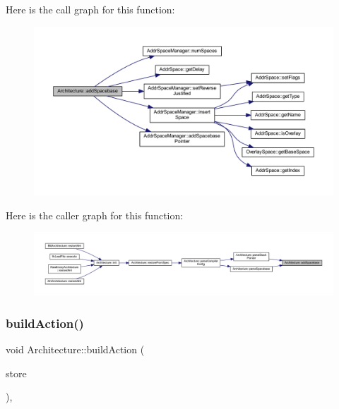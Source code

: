 Here is the call graph for this function\+:
\nopagebreak
\begin{figure}[H]
\begin{center}
\leavevmode
\includegraphics[width=350pt]{class_architecture_a3bbc62dedbb13b6fdb2969e1e83446d5_cgraph}
\end{center}
\end{figure}
Here is the caller graph for this function\+:
\nopagebreak
\begin{figure}[H]
\begin{center}
\leavevmode
\includegraphics[width=350pt]{class_architecture_a3bbc62dedbb13b6fdb2969e1e83446d5_icgraph}
\end{center}
\end{figure}
\mbox{\label{class_architecture_ad646d95818d9c3615da8a259732546b8}} 
\subsubsection{\texorpdfstring{buildAction()}{buildAction()}}
{\footnotesize\ttfamily void Architecture\+::build\+Action (\begin{DoxyParamCaption}\item[{\mbox{\hyperlink{class_document_storage}{Document\+Storage}} \&}]{store }\end{DoxyParamCaption})\hspace{0.3cm}{\ttfamily [protected]}, {\ttfamily [virtual]}}



